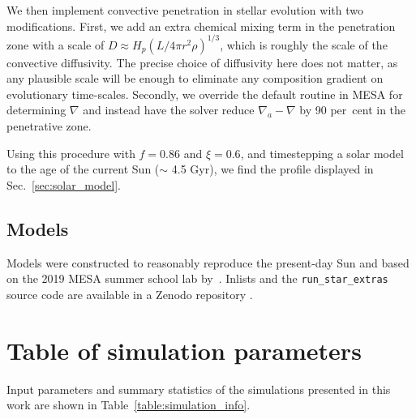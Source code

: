 \documentclass[twocolumn, linenumbers]{aastex631}
\begin{document}
We then implement convective penetration in stellar evolution with two modifications.
First, we add an extra chemical mixing term in the penetration zone with a scale of $D \approx H_p (L/4\pi r^2 \rho)^{1/3}$, which is roughly the scale of the convective diffusivity.
The precise choice of diffusivity here does not matter, as any plausible scale will be enough to eliminate any composition gradient on evolutionary time-scales.
Secondly, we override the default routine in MESA for determining $\nabla$ and instead have the solver reduce $\nabla_a-\nabla$ by 90 per~cent in the penetrative zone.

Using this procedure with $f = 0.86$ and $\xi = 0.6$, and timestepping a solar model to the age of the current Sun ($\sim$ 4.5 Gyr), we find the profile displayed in Sec.~\ref{sec:solar_model}.

\subsection{Models}

Models were constructed to reasonably reproduce the present-day Sun and based on the 2019 MESA summer school lab by~\citet{pm}.
Inlists and the \texttt{run\_star\_extras} source code are available in a Zenodo repository \citep{supp}.

\section{Table of simulation parameters}
\label{app:simulation_table}
Input parameters and summary statistics of the simulations presented in this work are shown in Table~\ref{table:simulation_info}.
\end{document}
